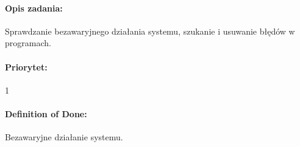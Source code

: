 \paragraph{Opis zadania:} 
Sprawdzanie bezawaryjnego działania systemu, szukanie i usuwanie błędów w programach.

\paragraph{Priorytet:} 
1

\paragraph{Definition of Done:}
Bezawaryjne działanie systemu.


	
